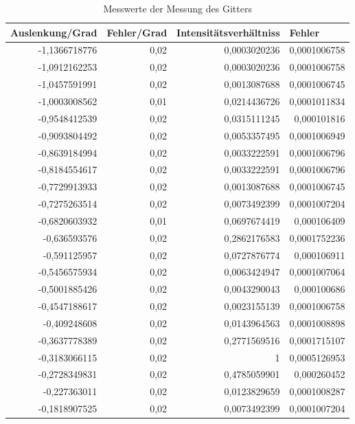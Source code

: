 \documentclass[12pt]{scrartcl}
\begin{document}
\begin{table}[htbp]
\caption{Messwerte der Messung des Gitters}
\begin{center}
\begin{tabular}{|r|r|r|r|}
\hline
\multicolumn{1}{|l|}{Auslenkung/Grad} & \multicolumn{1}{l|}{Fehler/Grad} & \multicolumn{1}{l|}{Intensitätsverhältniss} & \multicolumn{1}{l|}{Fehler} \\ \hline
-1,1366718776 & 0,02 & 0,0003020236 & 0,0001006758 \\ \hline
-1,0912162253 & 0,02 & 0,0003020236 & 0,0001006758 \\ \hline
-1,0457591991 & 0,02 & 0,0013087688 & 0,0001006745 \\ \hline
-1,0003008562 & 0,01 & 0,0214436726 & 0,0001011834 \\ \hline
-0,9548412539 & 0,02 & 0,0315111245 & 0,000101816 \\ \hline
-0,9093804492 & 0,02 & 0,0053357495 & 0,0001006949 \\ \hline
-0,8639184994 & 0,02 & 0,0033222591 & 0,0001006796 \\ \hline
-0,8184554617 & 0,02 & 0,0033222591 & 0,0001006796 \\ \hline
-0,7729913933 & 0,02 & 0,0013087688 & 0,0001006745 \\ \hline
-0,7275263514 & 0,02 & 0,0073492399 & 0,0001007204 \\ \hline
-0,6820603932 & 0,01 & 0,0697674419 & 0,000106409 \\ \hline
-0,636593576 & 0,02 & 0,2862176583 & 0,0001752236 \\ \hline
-0,591125957 & 0,02 & 0,0727876774 & 0,000106911 \\ \hline
-0,5456575934 & 0,02 & 0,0063424947 & 0,0001007064 \\ \hline
-0,5001885426 & 0,02 & 0,0043290043 & 0,000100686 \\ \hline
-0,4547188617 & 0,02 & 0,0023155139 & 0,0001006758 \\ \hline
-0,409248608 & 0,02 & 0,0143964563 & 0,0001008898 \\ \hline
-0,3637778389 & 0,02 & 0,2771569516 & 0,0001715107 \\ \hline
-0,3183066115 & 0,02 & 1 & 0,0005126953 \\ \hline
-0,2728349831 & 0,02 & 0,4785059901 & 0,000260452 \\ \hline
-0,227363011 & 0,02 & 0,0123829659 & 0,0001008287 \\ \hline
-0,1818907525 & 0,02 & 0,0073492399 & 0,0001007204 \\ \hline

\end{tabular}
\end{center}
\end{table}
\end{document}
